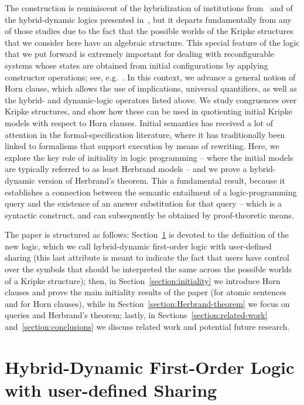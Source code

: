 \documentclass[a4paper,UKenglish,cleveref,autoref]{lipics-v2019}
\begin{document}
The construction is reminiscent of the hybridization of institutions from~\cite{MartinsMDB11,DiaconescuM16} and of the hybrid-dynamic logics presented in~\cite{BohrerP18,HennickerMK19}, but it departs fundamentally from any of those studies due to the fact that the possible worlds of the Kripke structures that we consider here have an algebraic structure.
This special feature of the logic that we put forward is extremely important for dealing with reconfigurable systems whose states are obtained from initial configurations by applying constructor operations; see, e.g.~\cite{GainaTR18}.
In this context, we advance a general notion of Horn clause, which allows the use of implications, universal quantifiers, as well as the hybrid- and dynamic-logic operators listed above.
We study congruences over Kripke structures, and show how these can be used in quotienting initial Kripke models with respect to Horn clauses.
Initial semantics has received a lot of attention in the formal-specification literature, where it has traditionally been linked to formalisms that support execution by means of rewriting.
Here, we explore the key role of initiality in logic programming -- where the initial models are typically referred to as least Herbrand models -- and we prove a hybrid-dynamic version of Herbrand's theorem.
This a fundamental result, because it establishes a connection between the semantic entailment of a logic-programming query and the existence of an answer substitution for that query -- which is a syntactic construct, and can subsequently be obtained by proof-theoretic means.

The paper is structured as follows:
Section~\ref{section:HDFOLS} is devoted to the definition of the new logic, which we call hybrid-dynamic first-order logic with user-defined sharing (this last attribute is meant to indicate the fact that users have control over the symbols that should be interpreted the same across the possible worlds of a Kripke structure);
then, in Section~\ref{section:initiality} we introduce Horn clauses and prove the main initiality results of the paper (for atomic sentences and for Horn clauses), while in Section~\ref{section:Herbrand-theorem} we focus on queries and Herbrand's theorem;
lastly, in Sections~\ref{section:related-work} and~\ref{section:conclusions} we discuss related work and potential future research.


\section{Hybrid-Dynamic First-Order Logic with user-defined Sharing}
\label{section:HDFOLS}
\end{document}
